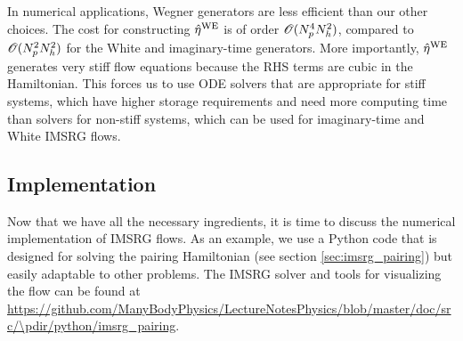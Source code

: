 In numerical applications, Wegner generators are less efficient than 
our other choices. The cost for constructing $\hat{\eta}^\text{WE}$ is of 
order $\mathcal{O}(N^4_pN^2_h)$, compared to $\mathcal{O}(N^2_pN^2_h)$ for the White
and imaginary-time generators. More importantly, $\hat{\eta}^\text{WE}$ 
generates very stiff flow equations because the RHS terms are cubic in 
the Hamiltonian. This forces us to use ODE solvers that are appropriate
for stiff systems, which have higher storage requirements and need more
computing time than solvers for non-stiff systems, which can be used
for imaginary-time and White IMSRG flows.




\subsection{\label{sec:imsrg_implementation}Implementation}
Now that we have all the necessary ingredients, it is time to discuss the
numerical implementation of IMSRG flows. As an example, we use a Python
code that is designed for solving the pairing Hamiltonian (see section 
\ref{sec:imsrg_pairing}) but easily adaptable to other problems. The
IMSRG solver and tools for visualizing the flow can be found at
\url{https://github.com/ManyBodyPhysics/LectureNotesPhysics/blob/master/doc/src/\pdir/python/imsrg_pairing}.

